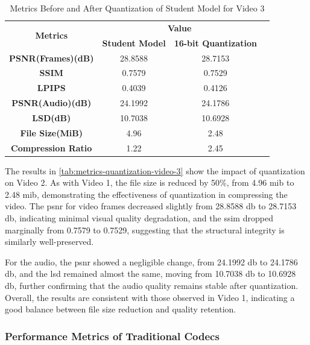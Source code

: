     \begin{table}[H]
        \centering
        \caption{Metrics Before and After Quantization of Student Model for Video 3}
        \label{tab:metrics-quantization-video-3}
        \begin{tabular}{|c|c|c|c|}
            \hline
            \multirow{2}{*}{\textbf{Metrics}} & \multicolumn{2}{c|}{\textbf{Value}} \\ \cline{2-3}
            & \textbf{Student Model} & \textbf{16-bit Quantization} \\ \hline
            \textbf{PSNR(Frames)(dB)} & 28.8588 & 28.7153 \\ \hline
            \textbf{SSIM} & 0.7579 & 0.7529 \\ \hline
            \textbf{LPIPS} & 0.4039 & 0.4126 \\ \hline
            \textbf{PSNR(Audio)(dB)} & 24.1992 & 24.1786 \\ \hline
            \textbf{LSD(dB)} & 10.7038 & 10.6928 \\ \hline
            \textbf{File Size(MiB)} & 4.96 & 2.48 \\ \hline
            \textbf{Compression Ratio} & 1.22 & 2.45\\ \hline
        \end{tabular}
    \end{table}

    The results in \autoref{tab:metrics-quantization-video-3} show the impact of quantization on Video 2. As with Video 1, the file size is reduced by 50\%, from 4.96 \gls{mib} to 2.48 \gls{mib}, demonstrating the effectiveness of quantization in compressing the video. The \gls{psnr} for video frames decreased slightly from 28.8588 \gls{db} to 28.7153 \gls{db}, indicating minimal visual quality degradation, and the \gls{ssim} dropped marginally from 0.7579 to 0.7529, suggesting that the structural integrity is similarly well-preserved.

    For the audio, the \gls{psnr} showed a negligible change, from 24.1992 \gls{db} to 24.1786 \gls{db}, and the \gls{lsd} remained almost the same, moving from 10.7038 \gls{db} to 10.6928 \gls{db}, further confirming that the audio quality remains stable after quantization. Overall, the results are consistent with those observed in Video 1, indicating a good balance between file size reduction and quality retention.


    \subsubsection{Performance Metrics of Traditional Codecs}

